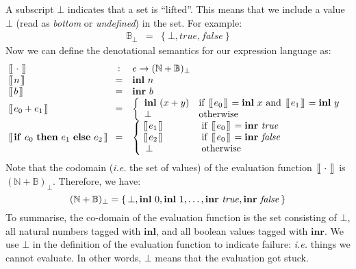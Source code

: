 \documentclass[10pt,a4paper]{exam}
\newcommand {\lbrac} {\makebox[0pt]{[\kern-1ex[}}
\newcommand {\rbrac} {\makebox[0pt]{]\kern-1ex]}}
\newcommand{\denote}[1]{\lbrac~#1~\rbrac}
\begin{document}
\begin{questions}
A subscript $\bot$ indicates that a set is ``lifted''. This means that we include a value $\bot$ (read as \emph{bottom} or \emph{undefined}) in the set. For example:
\begin{displaymath}
\begin{array}{lcl}
\mathbb{B}_{\bot} & = & \{~\bot, \mathit{true}, \mathit{false}~\}
\end{array}
\end{displaymath}
Now we can define the denotational semantics for our expression language as:
\begin{displaymath}
\begin{array}{lcl}
\denote{\cdot} & : & e \to (\mathbb{N} + \mathbb{B})_{\bot}\\
\denote{n}         & = & \mathbf{inl}~n \\
\denote{b}         & = & \mathbf{inr}~b \\
\denote{e_0 + e_1} & = & \left\{ \begin{array}{ll}
\mathbf{inl}~(x + y) & \text{if } ~\denote{e_0}~ = \mathbf{inl}~x \text{ and } ~\denote{e_1}~ = \mathbf{inl}~y \\
\bot & \text{otherwise}
\end{array}  \right.\\
\denote{\mathbf{if}~e_0~\mathbf{then}~e_1~\mathbf{else}~e_2} & = & \left\{\begin{array}{ll}
\denote{e_1} & \qquad \quad \; \text{if } ~\denote{e_0}~ = \mathbf{inr}~\mathit{true}\\
\denote{e_2} & \qquad \quad \; \text{if } ~\denote{e_0}~ = \mathbf{inr}~\mathit{false}\\
\bot         & \qquad \quad \; \text{otherwise}
\end{array}\right.
\end{array}
\end{displaymath}
Note that the codomain (\emph{i.e.} the set of values) of the evaluation function $~\denote{\cdot}~$ is $(\mathbb{N} + \mathbb{B})_{\bot}$. Therefore, we have:
\begin{displaymath}
(\mathbb{N} + \mathbb{B})_{\bot} = \{\,\bot, \mathbf{inl}~0,\mathbf{inl}~1, \ldots, \mathbf{inr}~\mathit{true}, \mathbf{inr}~\mathit{false}\,\}
\end{displaymath}
To summarise, the co-domain of the evaluation function is the set consisting of $\bot$, all natural numbers tagged with $\mathbf{inl}$, and all boolean values tagged with $\mathbf{inr}$. We use $\bot$ in the definition of the evaluation function to indicate failure: \emph{i.e.} things we cannot evaluate. In other words, $\bot$ means that the evaluation got stuck.


\end{questions}
\end{document}
